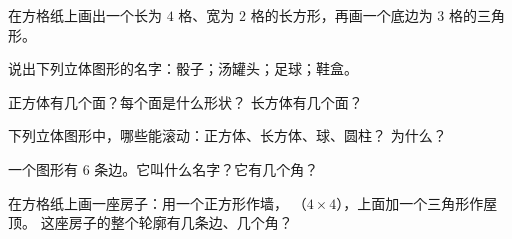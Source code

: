 \begin{exercise}[$\star$]\label{exo:g2:shapes:5}
在方格纸上画出一个长为 $4$ 格、宽为 $2$
格的长方形，再画一个底边为 $3$ 格的三角形。
\end{exercise}

\begin{exercise}[$\star$]\label{exo:g2:shapes:6}
说出下列立体图形的名字：骰子；汤罐头；足球；鞋盒。
\end{exercise}

\begin{exercise}[$\star$]\label{exo:g2:shapes:7}
正方体有几个面？每个面是什么形状？
长方体有几个面？
\end{exercise}

\begin{exercise}[$\star$]\label{exo:g2:shapes:8}
下列立体图形中，哪些能滚动：正方体、长方体、球、圆柱？
为什么？
\end{exercise}

\begin{exercise}[$\star$]\label{exo:g2:shapes:9}
一个图形有 $6$ 条边。它叫什么名字？它有几个角？
\end{exercise}

\begin{exercise}[$\star\star$]\label{exo:g2:shapes:10}
在方格纸上画一座房子：用一个正方形作墙，
（$4 \times 4$），上面加一个三角形作屋顶。
这座房子的整个轮廓有几条边、几个角？
\end{exercise}
